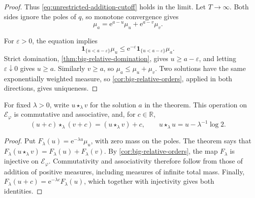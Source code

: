 \begin{proof}
Thus \eqref{eq:unrestricted-addition-cutoff} holds in the limit. Let $T\to\infty$. Both sides ignore the poles of $q$, so monotone convergence gives
\[
 \mu_a=\mathrm{e}^{a-u}\mu_u+\mathrm{e}^{a-v}\mu_v.
\]

For $\varepsilon>0$, the equation implies
\[
 \mathbf1_{\{u<a-\varepsilon\}}\mu_u
 \leq \mathrm{e}^{-\varepsilon}\mathbf1_{\{u<a-\varepsilon\}}\mu_a.
\]
Strict domination, \cref{thm:big-relative-domination}, gives $u\geq a-\varepsilon$, and letting $\varepsilon\downarrow0$ gives $u\geq a$. Similarly $v\geq a$, so $\mu_a\leq\mu_u+\mu_v$. Two solutions have the same exponentially weighted measure, so \cref{cor:big-relative-orders}, applied in both directions, gives uniqueness.
\end{proof}

\begin{corollary}\label{cor:weighted-addition-algebra}
For fixed $\lambda>0$, write $u\star_\lambda v$ for the solution $a$ in the theorem. This operation on $\mathcal E_\varphi$ is commutative and associative, and, for $c\in\mathbb R$,
\[
 (u+c)\star_\lambda(v+c)=(u\star_\lambda v)+c,
 \qquad
 u\star_\lambda u=u-\lambda^{-1}\log2.
\]
\end{corollary}
\begin{proof}
Put $F_\lambda(u)=\mathrm{e}^{-\lambda u}\mu_u$, with zero mass on the poles. The theorem says that
$F_\lambda(u\star_\lambda v)=F_\lambda(u)+F_\lambda(v)$.
By \cref{cor:big-relative-orders}, the map $F_\lambda$ is injective on $\mathcal E_\varphi$. Commutativity and associativity therefore follow from those of addition of positive measures, including measures of infinite total mass. Finally,
$F_\lambda(u+c)=\mathrm{e}^{-\lambda c}F_\lambda(u)$, which together with injectivity gives both identities.
\end{proof}
